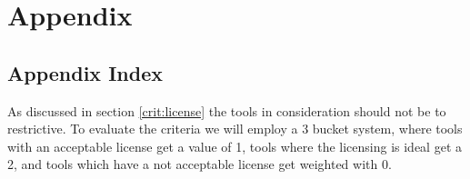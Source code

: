 \chapter*{Appendix}
\section*{Appendix Index}
\vspace{-8em}

\abstaendeanhangverzeichnis

\listofanhang
\clearpage
{} 








As discussed in section \ref{crit:license} the tools in consideration should not be to restrictive.
To evaluate the criteria we will employ a 3 bucket system, where tools with an acceptable license get a value of 1, tools where the licensing is ideal get a 2, and tools which have a not acceptable license get weighted with 0.

